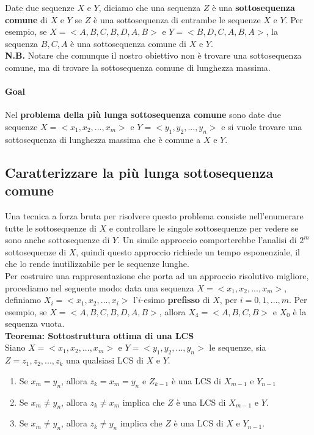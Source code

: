 Date due sequenze $X$ e $Y$, diciamo che una sequenza $Z$ è una
\textbf{sottosequenza comune} di $X$ e $Y$ se $Z$ è una
sottosequenza di entrambe le sequenze $X$ e $Y$. Per esempio, se
$X = <A,B,C,B,D,A,B>$ e $Y = <B,D,C,A,B,A>$, la sequenza $B,C,A$ è
una sottosequenza comune di $X$ e $Y$.\\

\textbf{N.B.} Notare che comunque il nostro obiettivo non è trovare una
sottosequenza comune, ma di trovare la sottosequenza comune di lunghezza
massima.

\paragraph{Goal}

Nel \textbf{problema della più lunga sottosequenza comune} sono date due
sequenze $X = <x_1, x_2, ..., x_m>$ e $Y = <y_1, y_2, ..., y_n>$ e
si vuole trovare una sottosequenza di lunghezza massima che è comune a
$X$ e $Y$.

\subsection{Caratterizzare la più lunga sottosequenza comune}

Una tecnica a forza bruta per risolvere questo problema consiste
nell'enumerare tutte le sottosequenze di $X$ e controllare le singole
sottosequenze per vedere se sono anche sottosequenze di $Y$. Un simile
approccio comporterebbe l'analisi di $2^m$ sottosequenze di $X$,
quindi questo approccio richiede un tempo esponenziale, il che lo rende
inutilizzabile per le sequenze lunghe.\\

Per costruire una rappresentazione che porta ad un approccio risolutivo
migliore, procediamo nel seguente modo: data una sequenza
$X = <x_1, x_2, ..., x_m>$, definiamo $X_i = <x_1, x_2, ..., x_i>$
l'$i$-esimo \textbf{prefisso} di $X$, per $i=0,1,...,m$. Per
esempio, se $X = <A,B,C,B,D,A,B>$, allora $X_4 = <A,B,C,B>$ e
$X_0$ è la sequenza vuota.\\

\textbf{Teorema: Sottostruttura ottima di una LCS}\\

Siano $X = <x_1, x_2, ..., x_m>$ e $Y = <y_1, y_2, ..., y_n>$ le
sequenze, sia $Z = z_1, z_2, ..., z_k$ una qualsiasi LCS di $X$ e
$Y$.

\begin{enumerate}
  \item Se $x_m = y_n$, allora $z_k = x_m = y_n$ e $Z_{k-1}$ è
        una LCS di $X_{m-1}$ e $Y_{n-1}$
  \item Se $x_m \ne y_n$, allora
        $z_k \ne x_m$ implica che $Z$ è una LCS di $X_{m-1}$ e $Y$.
  \item Se $x_m \ne y_n$, allora $z_k \ne y_n$ implica che $Z$ è una LCS
        di $X$ e $Y_{n-1}$.
\end{enumerate}


